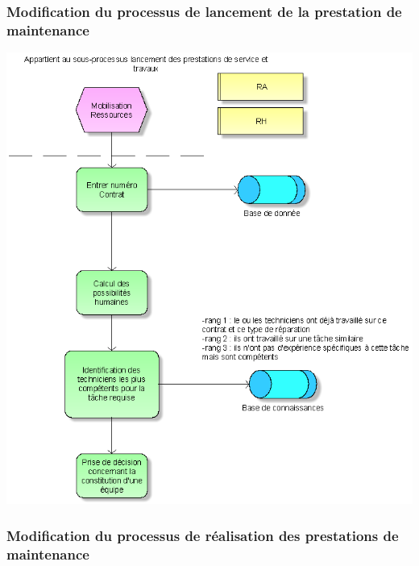 \subsubsection{Modification du processus de lancement de la prestation de maintenance}

\begin {center}
\includegraphics[width=\textwidth]{png_cible_fonctionnelle/AideMobileRessourcesHumaines.png}
\end {center}

\subsubsection{Modification du processus de réalisation des prestations de maintenance}


